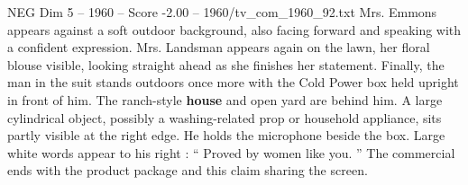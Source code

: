 \begin{textsample}{NEG Dim 5 – 1960 – Score -2.00 – 1960/tv\_com\_1960\_92.txt}
Mrs.
Emmons appears against a soft outdoor background, also facing forward and speaking with a confident expression.
Mrs.
Landsman appears again on the lawn, her floral blouse visible, looking straight ahead as she finishes her statement.
Finally, the man in the suit stands outdoors once more with the Cold Power box held upright in front of him.
The ranch-style \textbf{house} and open yard are behind him.
A large cylindrical object, possibly a washing-related prop or household appliance, sits partly visible at the right edge.
He holds the microphone beside the box.
Large white words appear to his right : “ Proved by women like you. ” The commercial ends with the product package and this claim sharing the screen.

\end{textsample}
